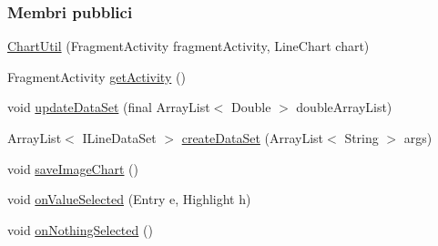 \subsubsection*{Membri pubblici}
\begin{DoxyCompactItemize}
\item 
\hyperlink{classit_1_1unibo_1_1torsello_1_1bluetoothpositioning_1_1util_1_1ChartUtil_a970bbc9180f662f25db53309407d562d_a970bbc9180f662f25db53309407d562d}{Chart\+Util} (Fragment\+Activity fragment\+Activity, Line\+Chart chart)
\item 
Fragment\+Activity \hyperlink{classit_1_1unibo_1_1torsello_1_1bluetoothpositioning_1_1util_1_1ChartUtil_a59150a6d20b6d0ad2fcf8c1ba858d355_a59150a6d20b6d0ad2fcf8c1ba858d355}{get\+Activity} ()
\item 
void \hyperlink{classit_1_1unibo_1_1torsello_1_1bluetoothpositioning_1_1util_1_1ChartUtil_aa9bda04d2c2058fb1b3fcd72c5a7471d_aa9bda04d2c2058fb1b3fcd72c5a7471d}{update\+Data\+Set} (final Array\+List$<$ Double $>$ double\+Array\+List)
\item 
Array\+List$<$ I\+Line\+Data\+Set $>$ \hyperlink{classit_1_1unibo_1_1torsello_1_1bluetoothpositioning_1_1util_1_1ChartUtil_a40268790f1c3f7ec34bd4296166048b4_a40268790f1c3f7ec34bd4296166048b4}{create\+Data\+Set} (Array\+List$<$ String $>$ args)
\item 
void \hyperlink{classit_1_1unibo_1_1torsello_1_1bluetoothpositioning_1_1util_1_1ChartUtil_a246a056ad6773a4b2d041e693570d02c_a246a056ad6773a4b2d041e693570d02c}{save\+Image\+Chart} ()
\item 
void \hyperlink{classit_1_1unibo_1_1torsello_1_1bluetoothpositioning_1_1util_1_1ChartUtil_a7f7609b8236d269e4f272f717b0b0294_a7f7609b8236d269e4f272f717b0b0294}{on\+Value\+Selected} (Entry e, Highlight h)
\item 
void \hyperlink{classit_1_1unibo_1_1torsello_1_1bluetoothpositioning_1_1util_1_1ChartUtil_a7e7f15aebf87926e19bc9e1ece289fde_a7e7f15aebf87926e19bc9e1ece289fde}{on\+Nothing\+Selected} ()
\end{DoxyCompactItemize}
